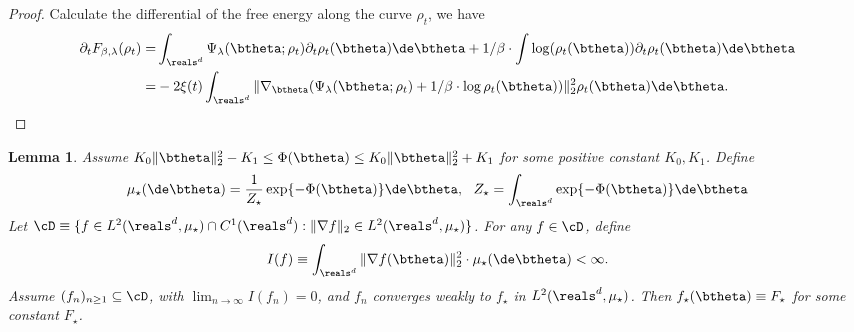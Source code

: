 \documentclass[11pt]{article}
\newtheorem{lemma}{Lemma}
\begin{document}
\begin{proof}
Calculate the differential of the free energy along the curve $\rho_t$, we have 
\[
\begin{aligned}
\partial_t F_{\beta, \lambda}(\rho_t) =& \int_{\reals^d}\Psi_\lambda(\btheta; \rho_t) \partial_t\rho_t(\btheta) \de \btheta + 1/\beta \cdot \int \log (\rho_t(\btheta)) \partial_t \rho_t(\btheta) \de \btheta \\
=& -2 \xi(t) \int_{\reals^d} \| \nabla_\btheta (\Psi_\lambda(\btheta; \rho_t) + 1/\beta \cdot \log \rho_t(\btheta)) \|_2^2 \rho_t(\btheta) \de \btheta.
\end{aligned}\label{eq:PartialFreeEnergy}
\]
\end{proof}


\begin{lemma}\label{lem:generalized_Poincare_inequality}
Assume $ K_0 \| \btheta \|_2^2 - K_1 \le \Phi(\btheta) \le  K_0 \| \btheta \|_2^2 + K_1 $ for some positive constant $K_0, K_1$. Define 
\begin{align}
\mu_\star(\de \btheta) = \frac{1}{Z_\star} \exp\{ - \Phi(\btheta) \} \de \btheta,~~ Z_\star = \int_{\reals^d} \exp\{ - \Phi(\btheta) \} \de \btheta
\end{align}
Let $\cD \equiv \{ f \in L^2(\reals^d, \mu_\star) \cap C^1(\reals^d): \| \nabla f \|_2 \in L^2(\reals^d, \mu_\star)\}$. For any $f \in \cD$, define 
\begin{align}
I(f) \equiv \int_{\reals^d} \| \nabla f (\btheta) \|_2^2 \cdot \mu_\star(\de \btheta) < \infty. 
\end{align}
Assume $(f_n)_{n \ge 1} \subseteq \cD$, with $\lim_{n\to \infty} I(f_n) = 0$, and $f_n$ converges weakly to $f_\star$ in $L^2(\reals^d, \mu_\star)$. Then $f_\star(\btheta) \equiv F_\star$ for some constant $F_\star$. 
\end{lemma}
\end{document}
